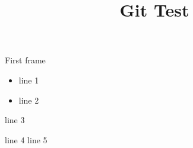 \documentclass[10pt]{beamer}
\begin{document}
	
	\title{Git Test}
	\frame{\titlepage}
	

\begin{frame}{First frame}

\begin{minipage}{.5\textwidth}
	\begin{itemize}
		\item line 1
		\item line 2
	\end{itemize}
\end{minipage}
\begin{minipage}{.4\textwidth}
	line 3
	\begin{block}{}
		line 4 \newline
		line 5
	\end{block}
\end{minipage}

\end{frame}
\end{document}

